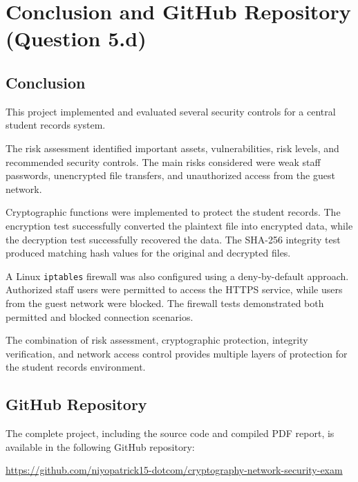 \documentclass[12pt,a4paper]{article}
\begin{document}

\newpage

\section{Conclusion and GitHub Repository (Question 5.d)}

\subsection{Conclusion}

This project implemented and evaluated several security controls for a central student records system.

The risk assessment identified important assets, vulnerabilities, risk levels, and recommended security controls. The main risks considered were weak staff passwords, unencrypted file transfers, and unauthorized access from the guest network.

Cryptographic functions were implemented to protect the student records. The encryption test successfully converted the plaintext file into encrypted data, while the decryption test successfully recovered the data. The SHA-256 integrity test produced matching hash values for the original and decrypted files.

A Linux \texttt{iptables} firewall was also configured using a deny-by-default approach. Authorized staff users were permitted to access the HTTPS service, while users from the guest network were blocked. The firewall tests demonstrated both permitted and blocked connection scenarios.

The combination of risk assessment, cryptographic protection, integrity verification, and network access control provides multiple layers of protection for the student records environment.

\subsection{GitHub Repository}

The complete project, including the source code and compiled PDF report, is available in the following GitHub repository:


\url{https://github.com/niyopatrick15-dotcom/cryptography-network-security-exam}


\end{document}
